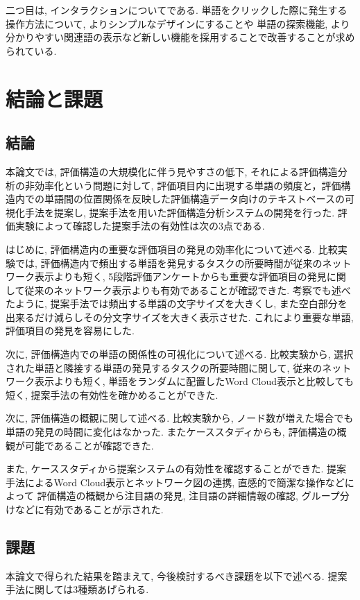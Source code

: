 \documentclass[syuuron]{kuee}
\begin{document}
		二つ目は, インタラクションについてである. 
		単語をクリックした際に発生する操作方法について, よりシンプルなデザインにすることや
		単語の探索機能, より分かりやすい関連語の表示など新しい機能を採用することで改善することが求められている. 

\chapter{結論と課題}
	\section{結論}
		本論文では, 評価構造の大規模化に伴う見やすさの低下, それによる評価構造分析の非効率化という問題に対して, 
		評価項目内に出現する単語の頻度と，評価構造内での単語間の位置関係を反映した評価構造データ向けのテキストベースの可視化手法を提案し, 
		提案手法を用いた評価構造分析システムの開発を行った. 
		評価実験によって確認した提案手法の有効性は次の3点である. 
		
		はじめに, 評価構造内の重要な評価項目の発見の効率化について述べる. 
		比較実験では, 評価構造内で頻出する単語を発見するタスクの所要時間が従来のネットワーク表示よりも短く, 
		5段階評価アンケートからも重要な評価項目の発見に関して従来のネットワーク表示よりも有効であることが確認できた. 
		考察でも述べたように, 提案手法では頻出する単語の文字サイズを大きくし, また空白部分を出来るだけ減らしその分文字サイズを大きく表示させた. 
		これにより重要な単語, 評価項目の発見を容易にした. 
		
		次に, 評価構造内での単語の関係性の可視化について述べる. 
		比較実験から, 選択された単語と隣接する単語の発見するタスクの所要時間に関して, 従来のネットワーク表示よりも短く, 
		単語をランダムに配置したWord Cloud表示と比較しても短く, 提案手法の有効性を確かめることができた. 
		
		次に, 評価構造の概観に関して述べる. 
		比較実験から, ノード数が増えた場合でも単語の発見の時間に変化はなかった. 
		またケーススタディからも, 評価構造の概観が可能であることが確認できた. 
		
		また, ケーススタディから提案システムの有効性を確認することができた. 
		提案手法によるWord Cloud表示とネットワーク図の連携, 直感的で簡潔な操作などによって
		評価構造の概観から注目語の発見, 注目語の詳細情報の確認, グループ分けなどに有効であることが示された. 		
		
	\section{課題}
		本論文で得られた結果を踏まえて, 今後検討するべき課題を以下で述べる. 
		提案手法に関しては3種類あげられる. 
		
\end{document}
